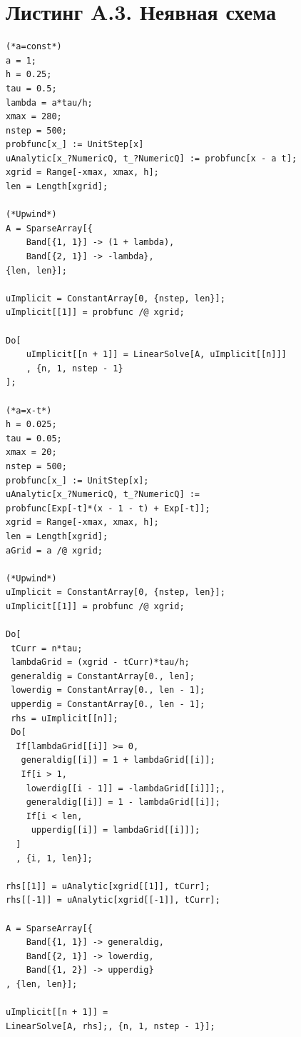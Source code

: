 \documentclass[a4paper,14pt]{extreport}
\begin{document}
\section*{Листинг A.3. Неявная схема}
\begin{lstlisting}
(*a=const*)
a = 1;
h = 0.25;
tau = 0.5;
lambda = a*tau/h;
xmax = 280;
nstep = 500;
probfunc[x_] := UnitStep[x]
uAnalytic[x_?NumericQ, t_?NumericQ] := probfunc[x - a t];
xgrid = Range[-xmax, xmax, h];
len = Length[xgrid];

(*Upwind*)
A = SparseArray[{
	Band[{1, 1}] -> (1 + lambda),
	Band[{2, 1}] -> -lambda},
{len, len}];

uImplicit = ConstantArray[0, {nstep, len}];
uImplicit[[1]] = probfunc /@ xgrid;

Do[
	uImplicit[[n + 1]] = LinearSolve[A, uImplicit[[n]]]
	, {n, 1, nstep - 1}
];

(*a=x-t*)
h = 0.025;
tau = 0.05;
xmax = 20;
nstep = 500;
probfunc[x_] := UnitStep[x];
uAnalytic[x_?NumericQ, t_?NumericQ] := 
probfunc[Exp[-t]*(x - 1 - t) + Exp[-t]];
xgrid = Range[-xmax, xmax, h];
len = Length[xgrid];
aGrid = a /@ xgrid;

(*Upwind*)
uImplicit = ConstantArray[0, {nstep, len}];
uImplicit[[1]] = probfunc /@ xgrid;

Do[
 tCurr = n*tau;
 lambdaGrid = (xgrid - tCurr)*tau/h;
 generaldig = ConstantArray[0., len];
 lowerdig = ConstantArray[0., len - 1];
 upperdig = ConstantArray[0., len - 1];
 rhs = uImplicit[[n]];
 Do[
  If[lambdaGrid[[i]] >= 0, 
   generaldig[[i]] = 1 + lambdaGrid[[i]];
   If[i > 1, 
    lowerdig[[i - 1]] = -lambdaGrid[[i]]];,
    generaldig[[i]] = 1 - lambdaGrid[[i]];
    If[i < len, 
     upperdig[[i]] = lambdaGrid[[i]]];
  ]
  , {i, 1, len}];
  
rhs[[1]] = uAnalytic[xgrid[[1]], tCurr];
rhs[[-1]] = uAnalytic[xgrid[[-1]], tCurr];

A = SparseArray[{
	Band[{1, 1}] -> generaldig,
	Band[{2, 1}] -> lowerdig,
	Band[{1, 2}] -> upperdig}
, {len, len}];

uImplicit[[n + 1]] =
LinearSolve[A, rhs];, {n, 1, nstep - 1}];
\end{lstlisting}
\end{document}
